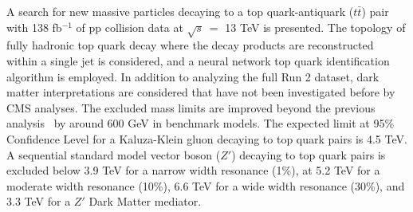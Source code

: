 
A search for new massive particles decaying to a top quark-antiquark ($t\bar{t}$) pair with 138 fb$^{-1}$ of pp collision data at $\sqrt{s}\ =$ 13 TeV is presented. The topology of fully hadronic top quark decay where the decay products are reconstructed within a single jet is considered, and a neural network top quark identification algorithm is employed. In addition to analyzing the full Run 2 dataset, dark matter interpretations are considered that have not been investigated before by CMS analyses. The excluded mass limits are improved beyond the previous analysis~\cite{13tevZprime_CMScombo2015} by around 600 GeV in benchmark models. The expected limit at 95\% Confidence Level for a Kaluza-Klein gluon decaying to top quark pairs is 4.5 TeV. A sequential standard model vector boson ($Z'$) decaying to top quark pairs is excluded below 3.9 TeV for a narrow width resonance (1\%), at 5.2 TeV for a moderate width resonance (10\%), 6.6 TeV for a wide width resonance (30\%), and 3.3 TeV for a $Z'$ Dark Matter mediator. 





